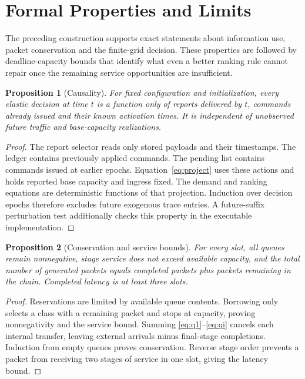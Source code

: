 \documentclass{IEEEoj}
\newtheorem{proposition}{Proposition}
\begin{document}
\section{Formal Properties and Limits}
The preceding construction supports exact statements about information use,
packet conservation and the finite-grid decision. These properties are followed
by deadline-capacity bounds that identify what even a better ranking rule cannot
repair once the remaining service opportunities are insufficient.

\begin{proposition}[Causality]
For fixed configuration and initialization, every elastic decision at time $t$
is a function only of reports delivered by $t$, commands already issued and
their known activation times. It is independent of unobserved future traffic
and base-capacity realizations.
\end{proposition}
\begin{proof}
The report selector reads only stored payloads and their timestamps. The ledger
contains previously applied commands. The pending list contains commands issued
at earlier epochs. Equation~\eqref{eq:project} uses these actions and holds
reported base capacity and ingress fixed. The demand and ranking equations are
deterministic functions of that projection. Induction over decision epochs
therefore excludes future exogenous trace entries. A future-suffix perturbation
test additionally checks this property in the executable implementation.
\end{proof}

\begin{proposition}[Conservation and service bounds]
For every slot, all queues remain nonnegative, stage service does not exceed
available capacity, and the total number of generated packets equals completed
packets plus packets remaining in the chain. Completed latency is at least
three slots.
\end{proposition}
\begin{proof}
Reservations are limited by available queue contents. Borrowing only selects a
class with a remaining packet and stops at capacity, proving nonnegativity and
the service bound. Summing \eqref{eq:q1}--\eqref{eq:qi} cancels each internal
transfer, leaving external arrivals minus final-stage completions. Induction
from empty queues proves conservation. Reverse stage order prevents a packet
from receiving two stages of service in one slot, giving the latency bound.
\end{proof}
\end{document}

